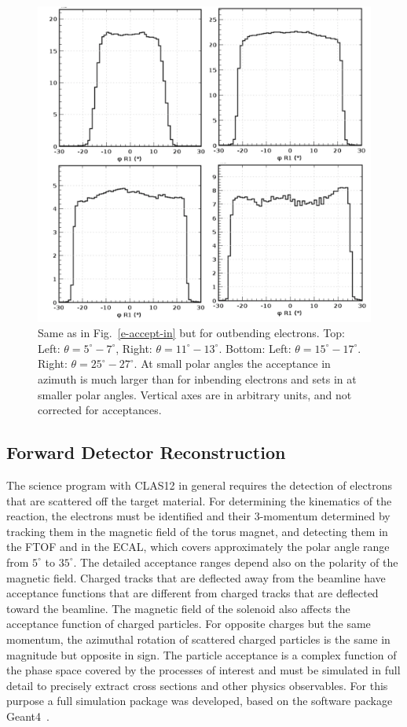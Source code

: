 \documentclass[final,3p,twocolumn]{elsarticle}
\begin{document}
\begin{figure}[t!]
\centerline{\includegraphics[width=0.85\columnwidth]{e_R1_phi_pub-out.png}}
\caption{Same as in Fig.~\ref{e-accept-in} but for outbending electrons. Top: Left: $\theta = 5^\circ-7^\circ$, Right: $\theta = 11^\circ-13^\circ$. Bottom: Left: $\theta = 15^\circ-17^\circ$. Right: $\theta = 25^\circ-27^\circ$. At small polar angles the acceptance in azimuth is much larger than for inbending electrons
  and sets in at smaller polar angles.
  Vertical axes are in arbitrary units, and not corrected for  acceptances.  }
\label{e-accept-out}
\end{figure}

\subsection{Forward Detector Reconstruction} 

The science program with CLAS12 in general requires the detection of electrons that are scattered off the target
material. For determining the kinematics of the reaction, the electrons must be identified and their 3-momentum
determined by tracking them in the magnetic field of the torus magnet, and detecting them in the FTOF and in the
ECAL, which covers approximately the polar angle range from $5^\circ$ to $35^\circ$. The detailed acceptance
ranges depend also on the polarity of the magnetic field. Charged tracks that are deflected away from the beamline
have acceptance functions that are different from charged tracks that are deflected toward the beamline. The
magnetic field of the solenoid also affects the acceptance function of charged particles. For opposite charges but
the same momentum, the azimuthal rotation of scattered charged particles is the same in magnitude but opposite in
sign. The particle acceptance is a complex function of the phase space covered by the processes of interest and 
must be simulated in full detail to precisely extract cross sections and other physics observables.  For this purpose 
a full simulation package was developed, based on the software package Geant4~\cite{GEMC}. 
\end{document}
